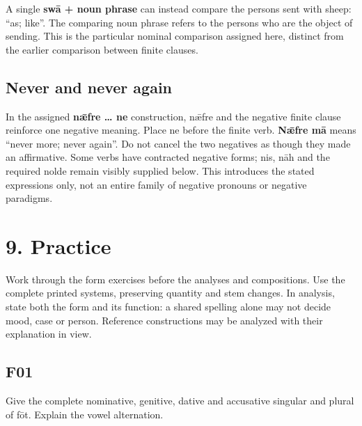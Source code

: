 A single \textbf{swā + noun phrase} can instead compare the persons sent with sheep: “as; like”. The comparing noun phrase refers to the persons who are the object of sending. This is the particular nominal comparison assigned here, distinct from the earlier comparison between finite clauses.

\subsection*{Never and never again}

In the assigned \textbf{nǣfre … ne} construction, nǣfre and the negative finite clause reinforce one negative meaning. Place ne before the finite verb. \textbf{Nǣfre mā} means “never more; never again”. Do not cancel the two negatives as though they made an affirmative. Some verbs have contracted negative forms; nis, nāh and the required nolde remain visibly supplied below. This introduces the stated expressions only, not an entire family of negative pronouns or negative paradigms.

\section*{9. Practice}

Work through the form exercises before the analyses and compositions. Use the complete printed systems, preserving quantity and stem changes. In analysis, state both the form and its function: a shared spelling alone may not decide mood, case or person. Reference constructions may be analyzed with their explanation in view.

\subsection*{F01}

\par\begin{minipage}{\linewidth}\raggedright
Give the complete nominative, genitive, dative and accusative singular and plural of fōt. Explain the vowel alternation.

\end{minipage}\par\addvspace{4pt}

